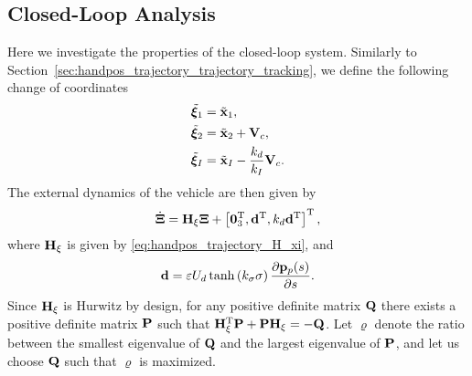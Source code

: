\subsection{Closed-Loop Analysis}
Here we investigate the properties of the closed-loop system.
Similarly to Section~\ref{sec:handpos_trajectory_trajectory_tracking}, we define the following change of coordinates
\begin{subequations}
    \begin{align}
        \tilde{\bm{\xi}}_1 &= \tilde{\mathbf{x}}_1, \\
        \tilde{\bm{\xi}}_2 &= \tilde{\mathbf{x}}_2 + \mathbf{V}_c, \\
        \tilde{\bm{\xi}}_I &= \tilde{\mathbf{x}}_I - \frac{k_d}{k_I}\mathbf{V}_c.
    \end{align} \label{eq:handpos_trajectory_hand_transform_CL_path}
\end{subequations}
The external dynamics of the vehicle are then given by
\begin{equation}
    \dot{\bm{\Xi}} = \mathbf{H}_{\xi}\bm{\Xi} + \left[\mathbf{0}_3^{\mathrm{T}}, \mathbf{d}^{\mathrm{T}}, k_d \mathbf{d}^{\mathrm{T}}\right]^{\mathrm{T}}, \label{eq:handpos_trajectory_external_dynamics_path}
\end{equation}
where $\mathbf{H}_{\xi}$ is given by \eqref{eq:handpos_trajectory_H_xi}, and
\begin{equation}
    \mathbf{d} = \varepsilon U_d \tanh\left(k_{\sigma}\sigma\right) \frac{\partial \mathbf{p}_p(s)}{\partial s}. \label{eq:handpos_trajectory_external_perturbation}
\end{equation}
Since $\mathbf{H}_{\xi}$ is Hurwitz by design, for any positive definite matrix $\mathbf{Q}$ there exists a positive definite matrix $\mathbf{P}$ such that $\mathbf{H}_{\xi}^{\mathrm{T}} \mathbf{P} + \mathbf{P} \mathbf{H}_{\xi} = -\mathbf{Q}$.
Let $\varrho$ denote the ratio between the smallest eigenvalue of $\mathbf{Q}$ and the largest eigenvalue of $\mathbf{P}$, and let us choose $\mathbf{Q}$ such that $\varrho$ is maximized.

